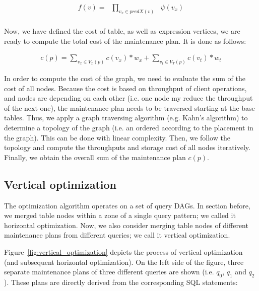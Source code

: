 \begin{equation} 
\begin{aligned} 	   
	f(v)=& \prod_{v_x \in predX(v)}&\psi(v_x)\\
\end{aligned}
\end{equation}


Now, we have defined the cost of table, as well as expression
vertices, we are ready to compute the total cost of the maintenance plan. It is
done as follows:

\begin{equation} 
\begin{aligned} 	   
   c(p)=\sum_{v_x \in V_x(p)} c(v_x)*w_x + \sum_{v_t \in V_T(p)} c(v_t)*w_t
\end{aligned}
\end{equation}

In order to compute the cost of the graph, we need to evaluate the sum 
of the cost of all nodes. Because the cost is based on throughput of client
operations, and nodes are depending on each other (i.e. one node my reduce
the throughput of the next one), the maintenance plan needs to be traversed 
starting at the base tables. Thus, we apply a graph traversing algorithm (e.g. 
Kahn's algorithm) to determine a topology of the graph (i.e. an ordered
according to the placement in the graph). This can be done with linear 
complexity. Then, we follow the topology and compute the throughputs and
storage cost of all nodes iteratively. Finally, we obtain the overall sum
of the maintenance plan $c(p)$.



\subsection{Vertical optimization}

The optimization algorithm operates on a set of query DAGs. In section
before, we merged table nodes within a zone of a single query pattern;
we called it horizontal optimization. Now, we also consider merging table 
nodes of different maintenance plans from different queries; we call it 
vertical optimization.

Figure~\ref{fig:vertical_optimization} depicts the process of vertical 
optimization (and subsequent horizontal optimization). On the left side 
of the figure, three separate maintenance plans of three different 
queries are shown (i.e. $q_0$, $q_1$ and $q_2$). These plans are 
directly derived from the corresponding SQL statements: 



